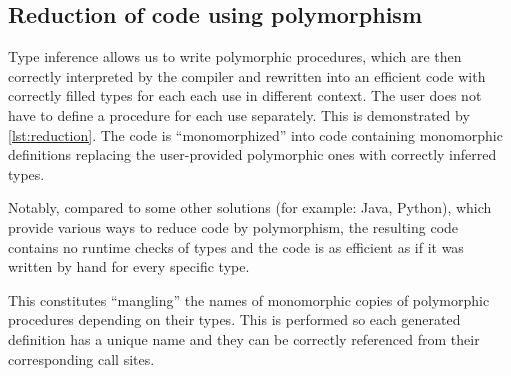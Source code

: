 \subsection{Reduction of code using polymorphism}
\label{sec:reduction}

Type inference allows us to write polymorphic procedures, which are then correctly interpreted by the compiler and rewritten into an efficient code with correctly filled types for each each use in different context. The user does not have to define a procedure for each use separately. This is demonstrated by \cref{lst:reduction}. The code is ``monomorphized'' into code containing monomorphic definitions replacing the user-provided polymorphic ones with correctly inferred types.

Notably, compared to some other solutions (for example: Java, Python), which provide various ways to reduce code by polymorphism, the resulting code contains no runtime checks of types and the code is as efficient as if it was written by hand for every specific type.

This constitutes ``mangling'' the names of monomorphic copies of polymorphic procedures depending on their types. This is performed so each generated definition has a unique name and they can be correctly referenced from their corresponding call sites.

